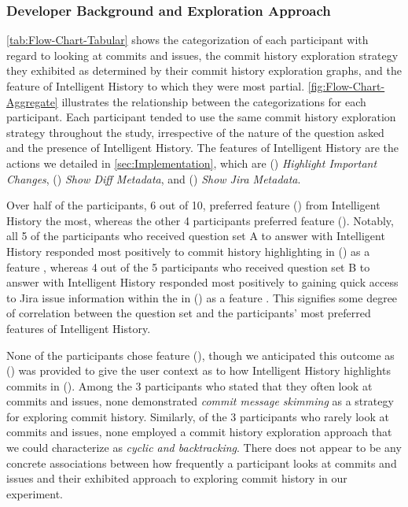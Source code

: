 \subsubsection{Developer Background and Exploration Approach}

\autoref{tab:Flow-Chart-Tabular} shows the categorization of each participant with regard to looking at commits and issues, 
the commit history exploration strategy they exhibited as determined by their commit history exploration graphs, 
and the feature of Intelligent History to which they were most partial.
\autoref{fig:Flow-Chart-Aggregate} illustrates the relationship between the categorizations for each participant.
Each participant tended to use the same commit history exploration strategy throughout the study, 
irrespective of the nature of the question asked and the presence of Intelligent History.
The features of Intelligent History are the actions we detailed in \autoref{sec:Implementation}, which are 
() \textit{Highlight Important Changes}, 
() \textit{Show Diff Metadata}, 
and () \textit{Show Jira Metadata}.

Over half of the participants, 6 out of 10, preferred feature () from Intelligent History the most,
whereas the other 4 participants preferred feature ().
Notably, all 5 of the participants who received question set A to answer with Intelligent History 
responded most positively to commit history highlighting in () as a feature , 
whereas 4 out of the 5 participants who received question set B to answer with Intelligent History 
responded most positively to gaining quick access to Jira issue information within the  in () as a feature .
This signifies some degree of correlation between the question set and the participants' most preferred features of Intelligent History.

None of the participants chose feature (), though we anticipated this outcome as () 
was provided to give the user context as to how Intelligent History highlights commits in ().
Among the 3 participants who stated that they often look at commits and issues, none demonstrated \textit{commit message skimming} 
as a strategy for exploring commit history.
Similarly, of the 3 participants who rarely look at commits and issues, none employed a commit history exploration approach 
that we could characterize as \textit{cyclic and backtracking}.
There does not appear to be any concrete associations between how frequently a participant looks at commits and issues
and their exhibited approach to exploring commit history in our experiment.

